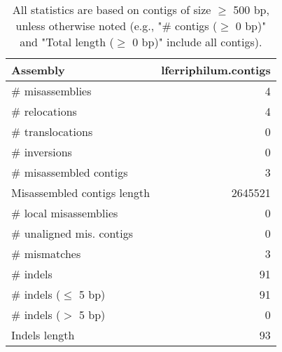 \documentclass[12pt,a4paper]{article}
\begin{document}
\begin{table}[ht]
\begin{center}
\caption{All statistics are based on contigs of size $\geq$ 500 bp, unless otherwise noted (e.g., "\# contigs ($\geq$ 0 bp)" and "Total length ($\geq$ 0 bp)" include all contigs).}
\begin{tabular}{|l*{1}{|r}|}
\hline
Assembly & lferriphilum.contigs \\ \hline
\# misassemblies & 4 \\ \hline
\hspace{5mm}\# relocations & 4 \\ \hline
\hspace{5mm}\# translocations & 0 \\ \hline
\hspace{5mm}\# inversions & 0 \\ \hline
\# misassembled contigs & 3 \\ \hline
Misassembled contigs length & 2645521 \\ \hline
\# local misassemblies & 0 \\ \hline
\# unaligned mis. contigs & 0 \\ \hline
\# mismatches & 3 \\ \hline
\# indels & 91 \\ \hline
\hspace{5mm}\# indels ($\leq$ 5 bp) & 91 \\ \hline
\hspace{5mm}\# indels ($>$ 5 bp) & 0 \\ \hline
Indels length & 93 \\ \hline
\end{tabular}
\end{center}
\end{table}
\end{document}
